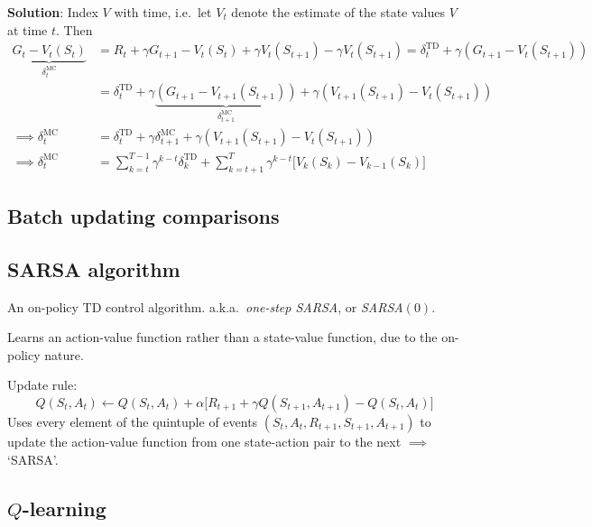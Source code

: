\textbf{Solution}:
Index \( V \) with time, i.e.\ let \( V_t \) denote the estimate of the state values \( V \) at time \( t \).
Then
\begin{align*}
    \underbrace{ G_t - V_t(S_t) }_{\delta_{t}^{\text{MC}}}
     & =
    R_t + \gamma G_{t+1} - V_t(S_t) + \gamma V_t(S_{t+1}) - \gamma V_t(S_{t+1})
    =
    \delta_{t}^{\text{TD}} + \gamma (G_{t+1} - V_t(S_{t+1}))
    \\ & =
    \delta_{t}^{\text{TD}} + \gamma \underbrace{ (G_{t+1} - V_{t+1}(S_{t+1})) }_{\delta_{t+1}^{\text{MC}}} + \gamma (V_{t+1}(S_{t+1}) - V_t(S_{t+1}))
    \\
    \implies
    \delta_{t}^{\text{MC}}
     & =
    \delta_{t}^{\text{TD}} + \gamma \delta_{t+1}^{\text{MC}} + \gamma (V_{t+1}(S_{t+1}) - V_t(S_{t+1}))
    \\
    \implies
    \delta_{t}^{\text{MC}}
     & =
    \sum_{k = t}^{T-1} \gamma^{k-t} \delta_{k}^{\text{TD}} + \boxed{ \sum_{k = t+1}^{T} \gamma^{k-t} \big[ V_{k}(S_{k}) - V_{k-1}(S_{k}) \big] }
\end{align*}

\subsection{Batch updating comparisons}

\subsection{SARSA algorithm}

An on-policy TD control algorithm.
a.k.a.~\textit{one-step SARSA}, or \textit{SARSA\( (0) \)}.

Learns an action-value function rather than a state-value function, due to the on-policy nature.

Update rule:
\begin{equation}
    Q(S_t, A_t) \leftarrow Q(S_t, A_t) + \alpha \Big[ R_{t+1} + \gamma Q(S_{t+1}, A_{t+1}) - Q(S_t, A_t) \Big]
\end{equation}
Uses every element of the quintuple of events \( (S_t, A_t, R_{t+1}, S_{t+1}, A_{t+1}) \) to update the action-value function from one state-action pair to the next \( \implies \) `SARSA'.

\subsection{\texorpdfstring{\( Q \)-learning}{Q-learning}}

